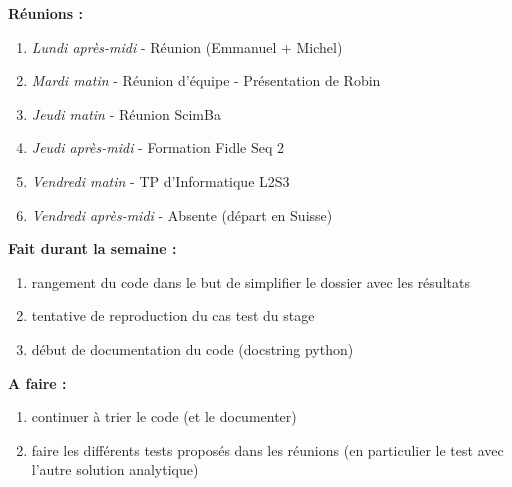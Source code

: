 \textbf{Réunions :}
\begin{enumerate}[label=\textbullet]
	\item \textit{Lundi après-midi} - Réunion (Emmanuel + Michel)
	\item \textit{Mardi matin} - Réunion d'équipe - Présentation de Robin
	\item \textit{Jeudi matin} - Réunion ScimBa
	\item \textit{Jeudi après-midi} - Formation Fidle Seq 2
	\item \textit{Vendredi matin} - TP d'Informatique L2S3
	\item \textit{Vendredi après-midi} - Absente (départ en Suisse)
\end{enumerate}
\textbf{Fait durant la semaine :}
\begin{enumerate}[label=\textbullet]
	\item rangement du code dans le but de simplifier le dossier avec les résultats
	\item tentative de reproduction du cas test du stage
	\item début de documentation du code (docstring python)
\end{enumerate}
\textbf{A faire :}
\begin{enumerate}[label=\textbullet]
	\item continuer à trier le code (et le documenter)
	\item faire les différents tests proposés dans les réunions (en particulier le test avec l'autre solution analytique)
\end{enumerate}